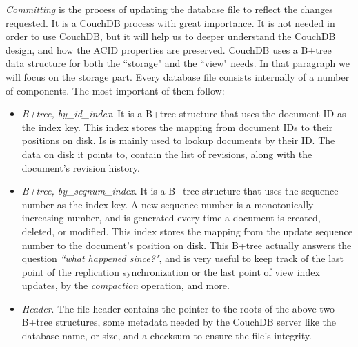 \begin{description}
    \emph{Committing} is the process of updating the database file to reflect
    the changes requested. It is a CouchDB process with great importance. It is
    not needed in order to use CouchDB, but it will help us to deeper understand
    the CouchDB design, and how the ACID properties are preserved. CouchDB uses a
    B+tree data structure for both the ``storage" and the ``view" needs. In that
    paragraph we will focus on the storage part. Every database file consists
    internally of a number of components. The most important of them follow:

    \begin{itemize}
      \item \emph{B+tree, by\_id\_index}. It is a B+tree structure that uses the
      document ID as the index key. This index stores the mapping from document
      IDs to their positions on disk. Is is mainly used to lookup documents by
      their ID. The data on disk it points to, contain the list of revisions,
      along with the document's revision history.
      \item \emph{B+tree, by\_seqnum\_index}. It is a B+tree structure that uses
      the sequence number as the index key. A new sequence number is a
      monotonically increasing number, and is generated every time a document is
      created, deleted, or modified. This index stores the mapping from the
      update sequence number to the document's position on disk. This B+tree
      actually answers the question \emph{``what happened since?"}, and is very
      useful to keep track of the last point of the replication synchronization
      or the last point of view index updates, by the \emph{compaction}
      operation, and more.
      \item \emph{Header}. The file header contains the pointer to the roots of
      the above two B+tree structures, some metadata needed by the CouchDB
      server like the database name, or size, and a checksum to ensure the
      file's integrity.
    \end{itemize}


\end{description}

